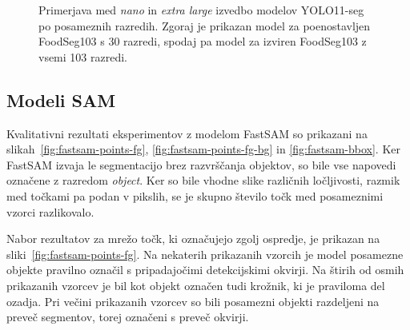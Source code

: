\documentclass[a4paper,twoside,openright,12pt,slovene]{book}
\begin{document}
\begin{figure}[!htbp]
                
                \caption[Primerjava \textit{nano} in \textit{extra large} različic modela YOLO11-n]{Primerjava med \textit{nano} in \textit{extra large} izvedbo modelov YOLO11-seg po posameznih razredih. Zgoraj je prikazan model za poenostavljen FoodSeg103 s 30 razredi, spodaj pa model za izviren FoodSeg103 z vsemi 103 razredi.}
                \label{fig:yolo11-bars}
            \end{figure}


        \subsection{Modeli SAM}

            Kvalitativni rezultati eksperimentov z modelom FastSAM so prikazani na
            slikah~\ref{fig:fastsam-points-fg},
            \ref{fig:fastsam-points-fg-bg}
            in
            \ref{fig:fastsam-bbox}.
            Ker FastSAM izvaja le segmentacijo brez razvrščanja objektov, so
            bile vse napovedi označene z razredom \emph{object}. Ker so bile
            vhodne slike različnih ločljivosti, razmik med točkami pa podan v
            pikslih, se je skupno število točk med posameznimi vzorci razlikovalo.

            Nabor rezultatov za mrežo točk, ki označujejo zgolj ospredje, je
            prikazan na
            sliki~\ref{fig:fastsam-points-fg}.
            Na nekaterih prikazanih vzorcih je model posamezne objekte pravilno
            označil s pripadajočimi detekcijskimi okvirji. Na štirih od osmih
            prikazanih vzorcev je bil kot objekt označen tudi krožnik, ki je praviloma
            del ozadja. Pri večini prikazanih vzorcev so bili posamezni objekti
            razdeljeni na preveč segmentov, torej označeni s preveč okvirji.
\end{document}

